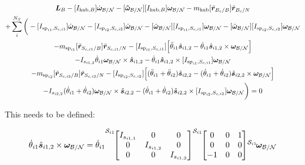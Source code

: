 \documentclass[paper]{aiaaNew}
\begin{document}
\begin{multline}
\bm L_B -[I_{\text{hub},B}] \dot{\bm\omega}_{\cal B/N}  -[\bm{\tilde{\omega}}_{\cal B/N}] [I_{\text{hub},B}] \bm\omega_{\cal B/N} - m_{\text{hub}} [\tilde{{\bm r}}_{B_c/B}] \ddot{\bm r}_{B_c/N} \\
+ \sum\limits_{i}^{N_S}\bigg(-[I_{\text{sp}_{i1},S_{c,i1}}] \dot{\bm \omega}_{\cal{B/N}} -[I_{\text{sp}_{i2},S_{c,i2}}] \dot{\bm \omega}_{\cal{B/N}} -[\tilde{\bm \omega}_{\cal{B/N}}] [I_{\text{sp}_{i1},S_{c,i1}}] \bm \omega_{\cal{B/N}}-[\tilde{\bm \omega}_{\cal{B/N}}] [I_{\text{sp}_{i2},S_{c,i2}}] \bm \omega_{\cal{B/N}}\\
 - m_{\text{sp}_{i1}} [\tilde{{\bm r}}_{S_{c,i1}/B}] \ddot{\bm r}_{S_{c,i1}/N} -[I_{\text{sp}_{i1},S_{c,i1}}] \Big[ \ddot{\theta}_{i1} \hat{\bm s}_{i1,2} - \dot{\theta}_{i1} \hat{\bm s}_{i1,2} \times \bm \omega_{\cal{B/N}} \Big]  \\
 -I_{s_{i1,2}} \dot{\theta}_{i1} \bm \omega_{\cal{B/N}} \times \hat{\bm s}_{i1,2} -\dot{\theta}_{i1} \hat{\bm s}_{i1,2} \times [I_{\text{sp}_{i1},S_{c,i1}}]\bm \omega_{\cal{B/N}}\\
- m_{\text{sp}_{i2}} [\tilde{{\bm r}}_{S_{c,i2}/B}] \ddot{\bm r}_{S_{c,i2}/N} -[I_{\text{sp}_{i2},S_{c,i2}}] \Big[ (\ddot{\theta}_{i1}  + \ddot{\theta}_{i2})\hat{\bm s}_{i2,2} - (\dot{\theta}_{i1}  + \dot{\theta}_{i2})  \hat{\bm s}_{i2,2} \times \bm \omega_{\cal{B/N}}\Big]  \\
-I_{s_{i2,2}}  (\dot{\theta}_{i1}  + \dot{\theta}_{i2}) \bm \omega_{\cal{B/N}} \times \hat{\bm s}_{i2,2} -(\dot{\theta}_{i1}  + \dot{\theta}_{i2})\hat{\bm s}_{i2,2} \times [I_{\text{sp}_{i2},S_{c,i2}}] \bm \omega_{\cal{B/N}}\bigg) = 0
\end{multline}

This needs to be defined:

\begin{equation}
[I_{\text{sp}_{i1},S_{c,i1}}] \dot{\theta}_{i1} \hat{\bm s}_{i1,2} \times \bm \omega_{\cal{B/N}} = \dot{\theta}_{i1} {\vphantom{\begin{bmatrix}
		I_{s_{i1,1}} & 0 & 0 \\
		0 & I_{s_{i1,2}} & 0 \\
		0 & 0 & I_{s_{i1,3}}
		\end{bmatrix}}}^{\mathcal{S}_{i1}\!}{\begin{bmatrix}
	I_{s_{i1,1}} & 0 & 0 \\
	0 & I_{s_{i1,2}} & 0 \\
	0 & 0 & I_{s_{i1,3}}
	\end{bmatrix}} {\vphantom{\begin{bmatrix}
		0 & 0 & 1 \\
		0 & 0 & 0 \\
		-1 & 0 & 0
		\end{bmatrix}}}^{\mathcal{S}_{i1}\!}{\begin{bmatrix}
	0 & 0 & 1 \\
	0 & 0 & 0 \\
	-1 & 0 & 0
	\end{bmatrix}} {\vphantom{\bm \omega_{\cal{B/N}}}}^{\mathcal{S}_{i1}\!}{\bm \omega_{\cal{B/N}}} 
\end{equation}
\end{document}
